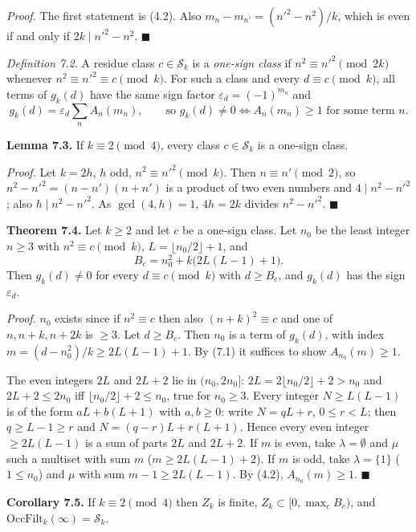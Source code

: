 \emph{Proof.} The first statement is (4.2). Also \(m_n-m_{n'}=(n'^2-n^2)/k\), which is even if and only if \(2k\mid n'^2-n^2\). \(\blacksquare\)

\emph{Definition 7.2.} A residue class \(c\in\mathcal S_k\) is a \emph{one-sign class} if \(n^2\equiv n'^2\pmod{2k}\) whenever \(n^2\equiv n'^2\equiv c\pmod k\). For such a class and every \(d\equiv c\pmod k\), all terms of \(g_k(d)\) have the same sign factor \(\varepsilon_d=(-1)^{m_n}\) and
\[g_k(d)=\varepsilon_d\sum_nA_n(m_n),\qquad\text{so }g_k(d)\ne0\iff A_n(m_n)\ge1\text{ for some term }n .\tag{7.1}\]

\textbf{Lemma 7.3.} If \(k\equiv2\pmod 4\), every class \(c\in\mathcal S_k\) is a one-sign class.

\emph{Proof.} Let \(k=2h\), \(h\) odd, \(n^2\equiv n'^2\pmod k\). Then \(n\equiv n'\pmod2\), so \(n^2-n'^2=(n-n')(n+n')\) is a product of two even numbers and \(4\mid n^2-n'^2\); also \(h\mid n^2-n'^2\). As \(\gcd(4,h)=1\), \(4h=2k\) divides \(n^2-n'^2\). \(\blacksquare\)

\textbf{Theorem 7.4.} Let \(k\ge2\) and let \(c\) be a one-sign class. Let \(n_0\) be the least integer \(n\ge3\) with \(n^2\equiv c\pmod k\), \(L=\lfloor n_0/2\rfloor+1\), and
\[B_c=n_0^2+k\bigl(2L(L-1)+1\bigr).\]
Then \(g_k(d)\ne0\) for every \(d\equiv c\pmod k\) with \(d\ge B_c\), and \(g_k(d)\) has the sign \(\varepsilon_d\).

\emph{Proof.} \(n_0\) exists since if \(n^2\equiv c\) then also \((n+k)^2\equiv c\) and one of \(n,n+k,n+2k\) is \(\ge3\). Let \(d\ge B_c\). Then \(n_0\) is a term of \(g_k(d)\), with index \(m=(d-n_0^2)/k\ge2L(L-1)+1\). By (7.1) it suffices to show \(A_{n_0}(m)\ge1\).

The even integers \(2L\) and \(2L+2\) lie in \((n_0,2n_0]\): \(2L=2\lfloor n_0/2\rfloor+2>n_0\) and \(2L+2\le2n_0\) iff \(\lfloor n_0/2\rfloor+2\le n_0\), true for \(n_0\ge3\). Every integer \(N\ge L(L-1)\) is of the form \(aL+b(L+1)\) with \(a,b\ge0\): write \(N=qL+r\), \(0\le r<L\); then \(q\ge L-1\ge r\) and \(N=(q-r)L+r(L+1)\). Hence every even integer \(\ge2L(L-1)\) is a sum of parts \(2L\) and \(2L+2\). If \(m\) is even, take \(\lambda=\emptyset\) and \(\mu\) such a multiset with sum \(m\) (\(m\ge2L(L-1)+2\)). If \(m\) is odd, take \(\lambda=\{1\}\) (\(1\le n_0\)) and \(\mu\) with sum \(m-1\ge2L(L-1)\). By (4.2), \(A_{n_0}(m)\ge1\). \(\blacksquare\)

\textbf{Corollary 7.5.} If \(k\equiv2\pmod 4\) then \(Z_k\) is finite, \(Z_k\subset[0,\max_cB_c)\), and \(\mathrm{OccFilt}_k(\infty)=\mathcal S_k\).

